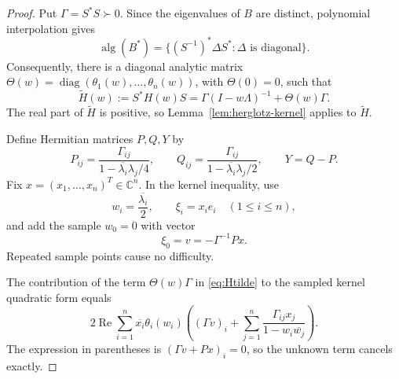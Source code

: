 \documentclass[preprints,article,submit,oneauthor]{Definitions/mdpi}
\theoremstyle{mdpi}
\theoremstyle{definition}
\newcommand{\C}{\mathbb C}
\newcommand{\alg}{\operatorname{alg}}
\newcommand{\RePart}{\operatorname{Re}}
\newcommand{\diag}{\operatorname{diag}}
\begin{document}
\begin{proof}
Put $\Gamma=S^*S\succ0$.  Since the eigenvalues of $B$ are distinct,
polynomial interpolation gives
\begin{equation}
  \alg(B^*)
  =\{(S^{-1})^*\Delta S^*: \Delta\text{ is diagonal}\}.
  \label{eq:adjoint-algebra}
\end{equation}
Consequently, there is a diagonal analytic matrix
$\Theta(w)=\diag(\theta_1(w),\ldots,\theta_n(w))$, with
$\Theta(0)=0$, such that
\begin{equation}
  \widetilde H(w):=S^*H(w)S
  =\Gamma(I-w\Lambda)^{-1}+\Theta(w)\Gamma.
  \label{eq:Htilde}
\end{equation}
The real part of $\widetilde H$ is positive, so
Lemma~\ref{lem:herglotz-kernel} applies to $\widetilde H$.

Define Hermitian matrices $P,Q,Y$ by
\begin{equation}
  P_{ij}=\frac{\Gamma_{ij}}
  {1-\overline{\lambda_i}\lambda_j/4},
  \qquad
  Q_{ij}=\frac{\Gamma_{ij}}
  {1-\overline{\lambda_i}\lambda_j/2},
  \qquad
  Y=Q-P.
  \label{eq:PQY}
\end{equation}
Fix $x=(x_1,\ldots,x_n)^T\in\C^n$.  In the kernel inequality, use
\begin{equation}
  w_i=\frac{\overline{\lambda_i}}2,
  \qquad
  \xi_i=x_i e_i
  \quad(1\leq i\leq n),
  \label{eq:sampling-points}
\end{equation}
and add the sample $w_0=0$ with vector
\begin{equation}
  \xi_0=v=-\Gamma^{-1}Px.
  \label{eq:origin-vector}
\end{equation}
Repeated sample points cause no difficulty.

The contribution of the term $\Theta(w)\Gamma$ in
\eqref{eq:Htilde} to the sampled kernel quadratic form equals
\begin{equation}
  2\RePart\sum_{i=1}^n
  \overline{x_i}\theta_i(w_i)
  \left((\Gamma v)_i+
  \sum_{j=1}^n
  \frac{\Gamma_{ij}x_j}{1-w_i\overline{w_j}}\right).
  \label{eq:theta-contribution}
\end{equation}
The expression in parentheses is
$(\Gamma v+Px)_i=0$, so the unknown term cancels exactly.


\end{proof}
\end{document}
